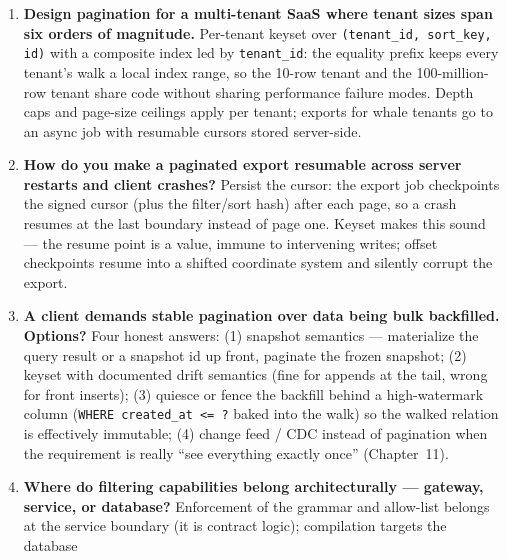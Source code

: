 \begin{enumerate}[label=\textbf{Q\arabic*.}, leftmargin=2.6em]
        the count runs per page per client under concurrency --- at millions
        of rows it dominates endpoint latency. Alternatives: opt-in counts,
        counts on page one only, planner estimates, pre-aggregated stats
        tables refreshed out of band, or threshold counting (exact up to a
        cap, ``10000+'' beyond it, computed with a \texttt{LIMIT}ed probe).
  \item \textbf{Design pagination for a multi-tenant SaaS where tenant sizes
        span six orders of magnitude.}
        Per-tenant keyset over \texttt{(tenant\_id, sort\_key, id)} with a
        composite index led by \texttt{tenant\_id}: the equality prefix keeps
        every tenant's walk a local index range, so the 10-row tenant and
        the 100-million-row tenant share code without sharing performance
        failure modes. Depth caps and page-size ceilings apply per tenant;
        exports for whale tenants go to an async job with resumable cursors
        stored server-side.
  \item \textbf{How do you make a paginated export resumable across server
        restarts and client crashes?}
        Persist the cursor: the export job checkpoints the signed cursor
        (plus the filter/sort hash) after each page, so a crash resumes at
        the last boundary instead of page one. Keyset makes this sound ---
        the resume point is a value, immune to intervening writes; offset
        checkpoints resume into a shifted coordinate system and silently
        corrupt the export.
  \item \textbf{A client demands stable pagination over data being bulk
        backfilled. Options?}
        Four honest answers: (1) snapshot semantics --- materialize the
        query result or a snapshot id up front, paginate the frozen
        snapshot; (2) keyset with documented drift semantics (fine for
        appends at the tail, wrong for front inserts); (3) quiesce or
        fence the backfill behind a high-watermark column
        (\texttt{WHERE created\_at <= ?} baked into the walk) so the
        walked relation is effectively immutable; (4) change feed / CDC
        instead of pagination when the requirement is really ``see
        everything exactly once'' (Chapter~11).
  \item \textbf{Where do filtering capabilities belong architecturally ---
        gateway, service, or database?}
        Enforcement of the grammar and allow-list belongs at the service
        boundary (it is contract logic); compilation targets the database

\end{enumerate}
